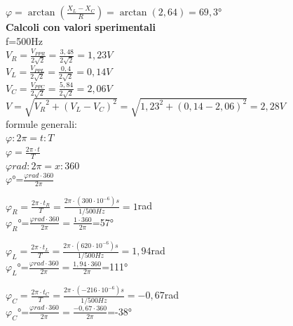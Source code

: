 \documentclass[12pt]{article}
\begin{document}
\begin{center}
\vspace{5mm}
$\varphi=\arctan(\frac{X_L - X_C}{R})=\arctan(2,64)=69,3$°\\
\vspace{10mm}
\textbf{Calcoli con valori sperimentali}\\
\vspace{5mm}
f=500Hz\\
\vspace{5mm}
$V_R=\frac{V_{PPR}}{2\sqrt{2}}=\frac{3,48}{2\sqrt{2}}=1,23V$\\
$V_L=\frac{V_{PPL}}{2\sqrt{2}}=\frac{0,4}{2\sqrt{2}}=0,14V$\\
$V_C=\frac{V_{PPC}}{2\sqrt{2}}=\frac{5,84}{2\sqrt{2}}=2,06V$\\
$V=\sqrt{{V_R}^2+(V_L-V_C)^2}=\sqrt{{1,23}^2+(0,14-2,06)^2}=2,28V$\\
\vspace{5mm}
formule generali:\\
${\varphi}:2\pi=t:T$ \\
${\varphi}=\frac{2\pi \cdot t}{T}$\\
${\varphi}rad:2\pi=x:360$\\
$\varphi$°=$\frac{\varphi rad \cdot 360}{2\pi}$\\
\vspace{10mm}

${\varphi}_R=\frac{2\pi \cdot t_R}{T}=\frac{2\pi \cdot (300 \cdot 10^{-6})s}{1/500Hz}=1$rad\\
${\varphi}_R$°=$\frac{\varphi rad \cdot 360}{2\pi}=\frac{1 \cdot 360}{2\pi}$=57°\\
\vspace{5mm}

${\varphi}_L=\frac{2\pi \cdot t_L}{T}=\frac{2\pi \cdot (620 \cdot 10^{-6})s}{1/500Hz}=1,94$rad\\
${\varphi}_L$°=$\frac{\varphi rad \cdot 360}{2\pi}=\frac{1,94 \cdot 360}{2\pi}$=111°\\
\vspace{5mm}

${\varphi}_C=\frac{2\pi \cdot t_C}{T}=\frac{2\pi \cdot (-216 \cdot 10^{-6})s}{1/500Hz}=-0,67$rad\\
${\varphi}_C$°=$\frac{\varphi rad \cdot 360}{2\pi}=\frac{-0,67 \cdot 360}{2\pi}$=-38°\\


\end{center}
\end{document}
